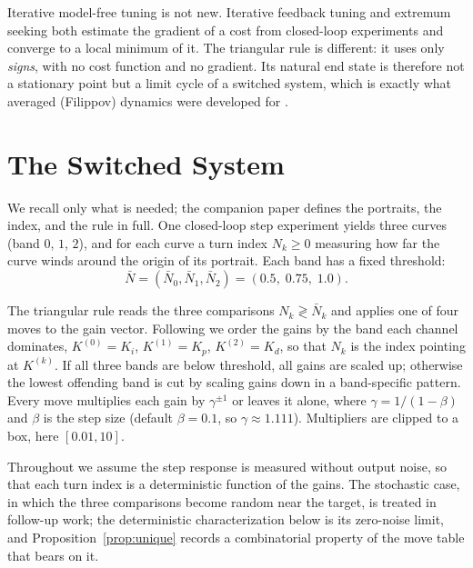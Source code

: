 \documentclass[letterpaper, 10pt, conference, twocolumn]{ieeeconf}
\newcommand{\Nbar}{\bar{N}}
\begin{document}
Iterative model-free tuning is not new. Iterative feedback tuning
\cite{Hjalmarsson1998} and extremum seeking \cite{Killingsworth2006} both
estimate the gradient of a cost from closed-loop experiments and converge to a
local minimum of it. The triangular rule is different: it uses only
\emph{signs}, with no cost function and no gradient. Its natural end state is
therefore not a stationary point but a limit cycle of a switched system, which
is exactly what averaged (Filippov) dynamics were developed for
\cite{Filippov1988}.

\section{The Switched System}
\label{sec:rule}

We recall only what is needed; the companion paper \cite{Paper1} defines the
portraits, the index, and the rule in full. One closed-loop step experiment
yields three curves (band $0$, $1$, $2$), and for each curve a turn index
$N_k \ge 0$ measuring how far the curve winds around the origin of its
portrait. Each band has a fixed threshold:
\begin{equation}
\Nbar = (\Nbar_0, \Nbar_1, \Nbar_2) = (0.5,\; 0.75,\; 1.0).
\label{eq:thresholds}
\end{equation}

The triangular rule reads the three comparisons $N_k \gtrless \Nbar_k$ and
applies one of four moves to the gain vector. Following \cite{Paper1} we
order the gains by the band each channel dominates,
$K^{(0)} = K_i$, $K^{(1)} = K_p$, $K^{(2)} = K_d$, so that $N_k$ is the index
pointing at $K^{(k)}$. If all
three bands are below threshold, all gains are scaled up; otherwise the lowest
offending band is cut by scaling gains down in a band-specific pattern. Every
move multiplies each gain by $\gamma^{\pm 1}$ or leaves it alone, where
$\gamma = 1/(1-\beta)$ and $\beta$ is the step size (default $\beta = 0.1$,
so $\gamma \approx 1.111$). Multipliers are clipped to a box, here
$[0.01, 10]$.

Throughout we assume the step response is measured without output noise, so
that each turn index is a deterministic function of the gains. The stochastic
case, in which the three comparisons become random near the target, is treated
in follow-up work; the deterministic characterization below is its zero-noise
limit, and Proposition~\ref{prop:unique} records a combinatorial property of
the move table that bears on it.
\end{document}
